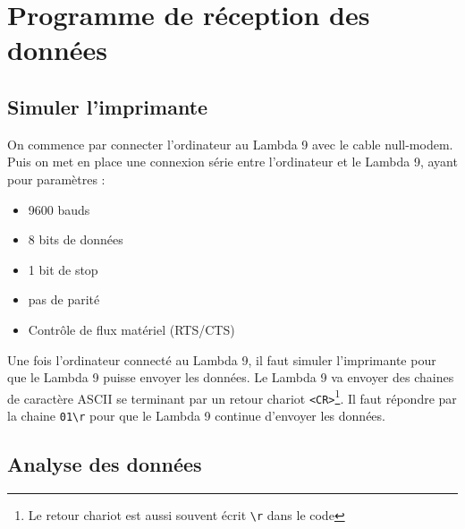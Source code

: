 \documentclass[a4paper, 12pt]{article}
\begin{document}
\newpage
\section{Programme de réception des données}\label{programme}
\subsection{Simuler l'imprimante}\label{simuler}


On commence par connecter l'ordinateur au Lambda 9 avec le cable null-modem.
Puis on met en place une connexion série entre l'ordinateur et le Lambda 9, ayant pour paramètres :
\begin{itemize}
	\item 9600 bauds
	\item 8 bits de données
	\item 1 bit de stop
	\item pas de parité
	\item Contrôle de flux matériel (RTS/CTS)
\end{itemize}


Une fois l'ordinateur connecté au Lambda 9, il faut simuler l'imprimante pour que le Lambda 9 puisse envoyer les données.
Le Lambda 9 va envoyer des chaines de caractère ASCII se terminant par un retour chariot \texttt{<CR>}\footnote{Le retour chariot est aussi souvent écrit \texttt{\textbackslash r} dans le code}.
Il faut répondre par la chaine \verb|01\r| pour que le Lambda 9 continue d'envoyer les données.

\subsection{Analyse des données}\label{analyse}
\end{document}

